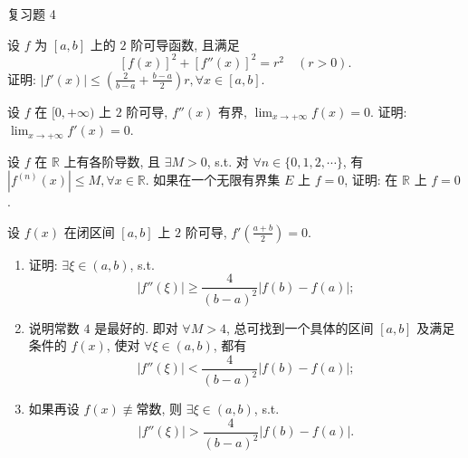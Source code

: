 \begin{exblock}{复习题 4}
\item 设 $f$ 为 $[a,b]$ 上的 $2$ 阶可导函数, 且满足
\[
[f(x)]^2+[f''(x)]^2=r^2\quad (r>0).
\]
证明: $|f'(x)|\leqslant\left(\frac{2}{b-a}+\frac{b-a}{2}\right)r, \forall x\in[a,b]$.

\item 设 $f$ 在 $[0,+\infty)$ 上 $2$ 阶可导, $f''(x)$ 有界, $\lim_{x\to+\infty}f(x)=0$. 证明: $\lim_{x\to+\infty}f'(x)=0$.

\item 设 $f$ 在 $\mathbb{R}$ 上有各阶导数, 且 $\exists M>0$, s.t. 对 $\forall n\in\{0,1,2,\cdots\}$, 有 $|f^{(n)}(x)|\leqslant M, \forall x\in\mathbb{R}$. 如果在一个无限有界集 $E$ 上 $f=0$, 证明: 在 $\mathbb{R}$ 上 $f=0$.

\item 设 $f(x)$ 在闭区间 $[a,b]$ 上 $2$ 阶可导, $f'\left(\frac{a+b}{2}\right)=0$.
\begin{enumerate}[label=(\arabic*)]
  \item 证明: $\exists\xi\in(a,b)$, s.t.
  \[
  |f''(\xi)|\geqslant\frac{4}{(b-a)^2}|f(b)-f(a)|;
\]
  \item 说明常数 $4$ 是最好的. 即对 $\forall M>4$, 总可找到一个具体的区间 $[a,b]$ 及满足条件的 $f(x)$, 使对 $\forall\xi\in(a,b)$, 都有
  \[
  |f''(\xi)|<\frac{4}{(b-a)^2}|f(b)-f(a)|;
\]
  \item 如果再设 $f(x)\not\equiv \text{常数}$, 则 $\exists\xi\in(a,b)$, s.t.
  \[
  |f''(\xi)|>\frac{4}{(b-a)^2}|f(b)-f(a)|.
\]
\end{enumerate}

\end{exblock}
